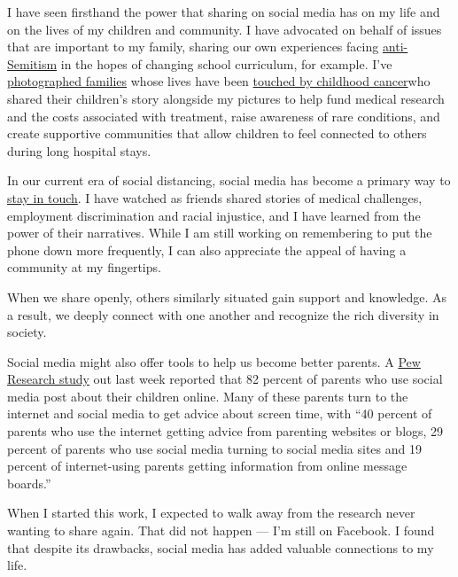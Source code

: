 I have seen firsthand the power that sharing on social media has on my
life and on the lives of my children and community. I have advocated on
behalf of issues that are important to my family, sharing our own
experiences facing
\href{https://www.gainesville.com/news/20190507/students-talk-about-anti-semitic-bullying-in-alachua-county-schools}{anti-Semitism}
in the hopes of changing school curriculum, for example. I've
\href{https://www.law.ufl.edu/law-news/law-professors-artistic-turn}{photographed
families} whose lives have been
\href{https://www.washingtonpost.com/news/parenting/wp/2016/09/20/families-of-children-with-cancer-ask-please-dont-look-away-heres-how-you-can-help/}{touched
by childhood cancer}who shared their children's story alongside my
pictures to help fund medical research and the costs associated with
treatment, raise awareness of rare conditions, and create supportive
communities that allow children to feel connected to others during long
hospital stays.

In our current era of social distancing, social media has become a
primary way to
\href{https://www.washingtonpost.com/lifestyle/2020/04/06/this-may-be-time-harness-power-social-media-family/}{stay
in touch}. I have watched as friends shared stories of medical
challenges, employment discrimination and racial injustice, and I have
learned from the power of their narratives. While I am still working on
remembering to put the phone down more frequently, I can also appreciate
the appeal of having a community at my fingertips.

When we share openly, others similar­ly situated gain support and
knowledge. As a result, we deeply connect with one another and recognize
the rich diversity in society.

Social media might also offer tools to help us become better parents. A
\href{https://www.pewresearch.org/internet/2020/07/28/parents-attitudes-and-experiences-related-to-digital-technology/}{Pew
Research study} out last week reported that 82 percent of parents who
use social media post about their children online. Many of these parents
turn to the internet and social media to get advice about screen time,
with ``40 percent of parents who use the internet getting advice from
parenting websites or blogs, 29 percent of parents who use social media
turning to social media sites and 19 percent of internet-using parents
getting information from online message boards.''

When I started this work, I expected to walk away from the research
never wanting to share again. That did not happen --- I'm still on
Facebook. I found that despite its drawbacks, social media has added
valuable connections to my life.

